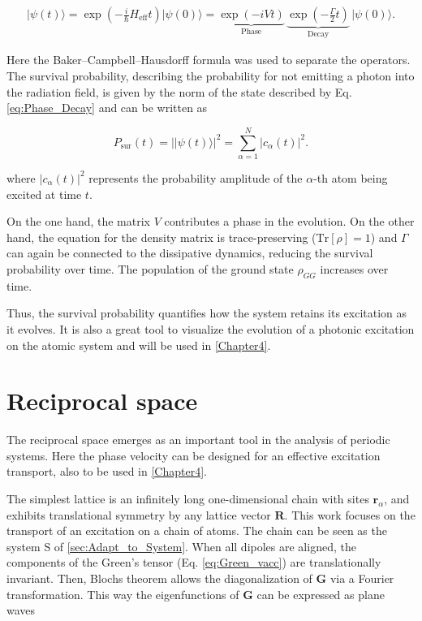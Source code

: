 \begin{align} \label{eq:Phase_Decay}
\vert  \psi(t) \rangle = \exp{\left(-\frac{i}{\hbar} H_{\text{eff}} t\right)} \vert  \psi(0) \rangle =
\underbrace{\exp(-i V t)}_{\text{Phase}} \,
\underbrace{\exp(-\frac{\Gamma}{2} t)}_{\text{Decay}} \,
\vert  \psi(0) \rangle \text{.}
\end{align}

\noindent
Here the Baker–Campbell–Hausdorff formula was used to separate the operators.
The survival probability, describing the probability for not emitting a photon into the radiation field,
is given by the norm of the state described by Eq. \eqref{eq:Phase_Decay} and can be written as

\begin{equation}
    P_{\text{sur}}(t) = \vert \vert  \psi(t) \rangle \vert^2 = \sum_{\alpha=1}^{N} \vert c_{\alpha}(t) \vert^2 \text{.}
\end{equation}

\noindent
where \( \vert c_{\alpha}(t) \vert^2 \) represents the probability amplitude of the \(\alpha\)-th atom being excited at time \( t \).

\noindent
On the one hand, the matrix $ V $ contributes a phase in the evolution.
On the other hand, the equation for the density matrix is trace-preserving ($\text{Tr}[\rho] = 1$) and
$ \Gamma $ can again be connected to the dissipative dynamics, reducing the survival probability over time.
The population of the ground state $ \rho_{GG} $ increases over time.

\noindent
Thus, the survival probability quantifies how the system retains its excitation as it evolves.
It is also a great tool to visualize the evolution of a photonic excitation on the atomic system and will be used in \autoref{Chapter4}.




\section{Reciprocal space} \label{sec:K-space}
The reciprocal space emerges as an important tool in the analysis of periodic systems.
Here the phase velocity can be designed for an effective excitation transport, also to be used in \autoref{Chapter4}.


\noindent
The simplest lattice is an infinitely long one-dimensional chain with sites $ \mathbf{r}_\alpha$,
and exhibits translational symmetry by any lattice vector $\mathbf{R}$.
This work focuses on the transport of an excitation on a chain of atoms.
The chain can be seen as the system S of \autoref{sec:Adapt_to_System}.
When all dipoles are aligned, the components of the Green's tensor (Eq. \eqref{eq:Green_vacc}) are translationally invariant.
Then, Blochs theorem \cite{Bloch1929} allows the diagonalization of $ \mathbf{G} $ via a Fourier transformation.
This way the eigenfunctions of $ \mathbf{G} $ can be expressed as plane waves

